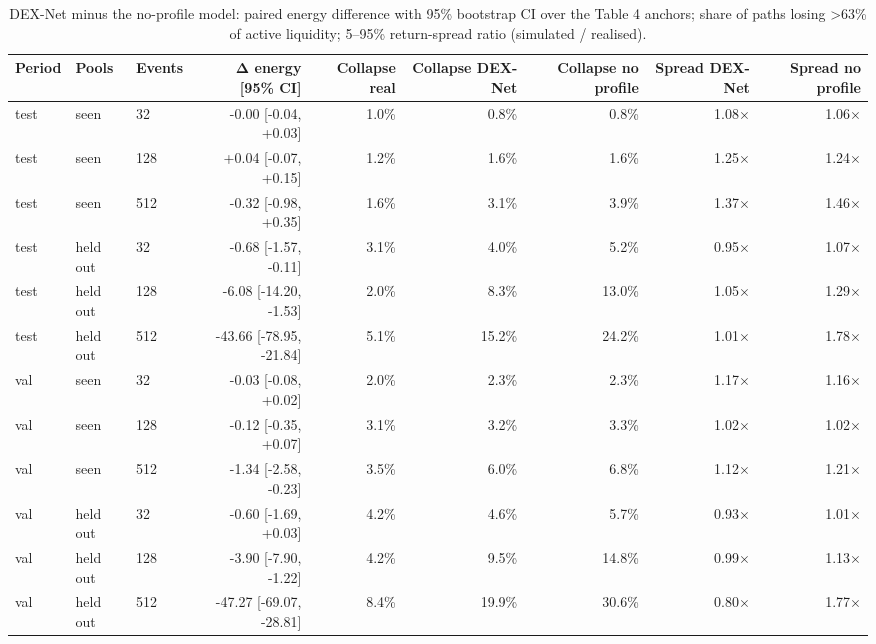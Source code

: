 \begin{table}[t]
\centering
\small
\caption{DEX-Net minus the no-profile model: paired energy difference with 95\% bootstrap CI over the Table 4 anchors; share of paths losing >63\% of active liquidity; 5–95\% return-spread ratio (simulated / realised).}
\label{tab:depth_vs_reference}
\begin{adjustbox}{max width=\linewidth}
\begin{tabular}{lllrrrrrr}
\toprule
Period & Pools & Events & Δ energy [95\% CI] & Collapse real & Collapse DEX-Net & Collapse no profile & Spread DEX-Net & Spread no profile \\
\midrule
test & seen & 32 & -0.00 [-0.04, +0.03] & 1.0\% & 0.8\% & 0.8\% & 1.08$\times$ & 1.06$\times$ \\
test & seen & 128 & +0.04 [-0.07, +0.15] & 1.2\% & 1.6\% & 1.6\% & 1.25$\times$ & 1.24$\times$ \\
test & seen & 512 & -0.32 [-0.98, +0.35] & 1.6\% & 3.1\% & 3.9\% & 1.37$\times$ & 1.46$\times$ \\
test & held out & 32 & -0.68 [-1.57, -0.11] & 3.1\% & 4.0\% & 5.2\% & 0.95$\times$ & 1.07$\times$ \\
test & held out & 128 & -6.08 [-14.20, -1.53] & 2.0\% & 8.3\% & 13.0\% & 1.05$\times$ & 1.29$\times$ \\
test & held out & 512 & -43.66 [-78.95, -21.84] & 5.1\% & 15.2\% & 24.2\% & 1.01$\times$ & 1.78$\times$ \\
val & seen & 32 & -0.03 [-0.08, +0.02] & 2.0\% & 2.3\% & 2.3\% & 1.17$\times$ & 1.16$\times$ \\
val & seen & 128 & -0.12 [-0.35, +0.07] & 3.1\% & 3.2\% & 3.3\% & 1.02$\times$ & 1.02$\times$ \\
val & seen & 512 & -1.34 [-2.58, -0.23] & 3.5\% & 6.0\% & 6.8\% & 1.12$\times$ & 1.21$\times$ \\
val & held out & 32 & -0.60 [-1.69, +0.03] & 4.2\% & 4.6\% & 5.7\% & 0.93$\times$ & 1.01$\times$ \\
val & held out & 128 & -3.90 [-7.90, -1.22] & 4.2\% & 9.5\% & 14.8\% & 0.99$\times$ & 1.13$\times$ \\
val & held out & 512 & -47.27 [-69.07, -28.81] & 8.4\% & 19.9\% & 30.6\% & 0.80$\times$ & 1.77$\times$ \\
\bottomrule
\end{tabular}
\end{adjustbox}
\end{table}
